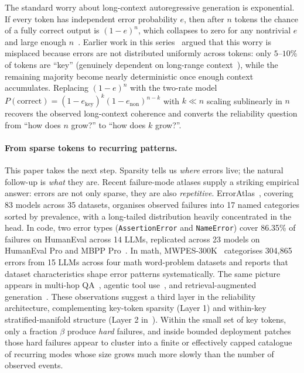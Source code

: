 \documentclass{article}
\theoremstyle{taeplain}
\theoremstyle{taedefn}
\begin{document}
The standard worry about long-context autoregressive generation is exponential. If every token has independent error probability $e$, then after $n$ tokens the chance of a fully correct output is $(1-e)^n$, which collapses to zero for any nontrivial $e$ and large enough $n$~\citep{lecun2023doomed,dziri2023faith}. Earlier work in this series~\citep{arbuzov2025beyond} argued that this worry is misplaced because errors are not distributed uniformly across tokens: only $5$--$10\%$ of tokens are ``key'' (genuinely dependent on long-range context~\citep{fang2025perplexity}), while the remaining majority become nearly deterministic once enough context accumulates. Replacing $(1-e)^n$ with the two-rate model $P(\text{correct}) = (1-e_{\text{key}})^{k} (1-e_{\text{non}})^{n-k}$ with $k \ll n$ scaling sublinearly in $n$ recovers the observed long-context coherence and converts the reliability question from ``how does $n$ grow?'' to ``how does $k$ grow?''.

\paragraph{From sparse tokens to recurring patterns.}
This paper takes the next step. Sparsity tells us \emph{where} errors live; the natural follow-up is \emph{what} they are. Recent failure-mode atlases supply a striking empirical answer: errors are not only sparse, they are also \emph{repetitive}. ErrorAtlas~\citep{ashurytahan2026erroratlas}, covering 83 models across 35 datasets, organises observed failures into 17 named categories sorted by prevalence, with a long-tailed distribution heavily concentrated in the head. In code, two error types (\texttt{AssertionError} and \texttt{NameError}) cover 86.35\% of failures on HumanEval across 14 LLMs, replicated across 23 models on HumanEval Pro and MBPP Pro~\citep{wen2024fixing}. In math, MWPES-300K~\citep{sun2025mwpes} categorises 304,865 errors from 15 LLMs across four math word-problem datasets and reports that dataset characteristics shape error patterns systematically. The same picture appears in multi-hop QA~\citep{zhang2026weakestlink}, agentic tool use~\citep{cemri2025mast}, and retrieval-augmented generation~\citep{wood2024acurai}. These observations suggest a third layer in the reliability architecture, complementing key-token sparsity (Layer 1) and within-key stratified-manifold structure (Layer 2 in~\citealt{arbuzov2025beyond}). Within the small set of key tokens, only a fraction $\beta$ produce \emph{hard} failures, and inside bounded deployment patches those hard failures appear to cluster into a finite or effectively capped catalogue of recurring modes whose size grows much more slowly than the number of observed events.
\end{document}
